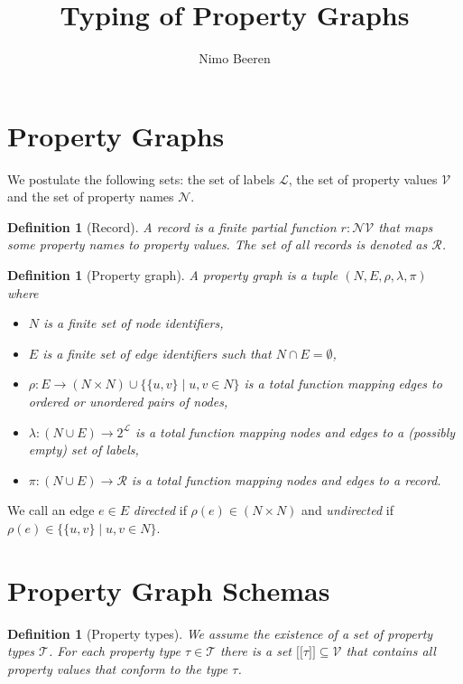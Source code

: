 \documentclass[a4paper]{article}
\title{Typing of Property Graphs}
\author{Nimo Beeren}
\makeatletter
\newtheorem{definition}[theorem]{Definition}
\newcommand{\ptype}{\tau}
\newcommand{\lsem}{\ensuremath{[\![}}
\newcommand{\rsem}{\ensuremath{]\!]}}
\newcommand{\sem}[1]{\ensuremath{\lsem #1 \rsem}}
\newcommand{\pto}{}%
\DeclareRobustCommand{\pto}{\mathrel{\mathpalette\p@to@gets\to}}
\newcommand{\p@to@gets}[2]{%
  \ooalign{\hidewidth$\m@th#1\mapstochar\mkern5mu$\hidewidth\cr$\m@th#1\to$\cr}%
}
\makeatother
\begin{document}
\section{Property Graphs}

We postulate the following sets: the set of labels $\mathcal{L}$, the set of property values $\mathcal{V}$ and the set of property names $\mathcal{N}$.

\begin{definition}[Record]
  A \emph{record} is a finite partial function $r : \mathcal{N} \pto \mathcal{V}$ that maps some property names to property values. The set of all records is denoted as $\mathcal{R}$.
\end{definition}

\begin{definition}[Property graph]
  A \emph{property graph} is a tuple $(N, E, \rho, \lambda, \pi)$ where
  \begin{itemize}
    \item $N$ is a finite set of node identifiers,
    \item $E$ is a finite set of edge identifiers such that $N \cap E = \emptyset$,
    \item $\rho : E \to (N \times N) \cup \{\{u, v\} \mid u, v \in N\}$ is a total function mapping edges to ordered or unordered pairs of nodes,
    \item $\lambda : (N \cup E) \to 2^{\mathcal{L}}$ is a total function mapping nodes and edges to a (possibly empty) set of labels,
    \item $\pi : (N \cup E) \to \mathcal{R}$ is a total function mapping nodes and edges to a record.
  \end{itemize}
\end{definition}

We call an edge $e \in E$ \emph{directed} if $\rho(e) \in (N \times N)$ and \emph{undirected} if $\rho(e) \in \{\{u, v\} \mid u, v \in N\}$.

\section{Property Graph Schemas}


\begin{definition}[Property types]
  We assume the existence of a set of \emph{property types} $\mathcal{T}$. For each property type $\ptype \in \mathcal{T}$ there is a set $\sem{\ptype} \subseteq \mathcal{V}$ that contains all property values that \emph{conform} to the type $\ptype$.
\end{definition}
\end{document}
